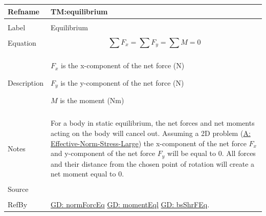 \documentclass[12pt]{article}
\begin{document}
\noindent \begin{minipage}{\textwidth}
\begin{tabular}{p{} p{}}
\toprule \textbf{Refname} & \textbf{TM:equilibrium}
\label{TM:equilibrium}
\\ \midrule \\
Label & Equilibrium
        \\ \midrule \\
        Equation & \begin{displaymath}
                   \displaystyle\sum{{F_{x}}}=\displaystyle\sum{{F_{y}}}=\displaystyle\sum{M}=0
                   \end{displaymath}
                   \\ \midrule \\
                   Description & \begin{symbDescription}
                                 \item{${F_{x}}$ is the x-component of the net force (N)}
                                 \item{${F_{y}}$ is the y-component of the net force (N)}
                                 \item{$M$ is the moment (Nm)}
                                 \end{symbDescription}
                                 \\ \midrule \\
                                 Notes & For a body in static equilibrium, the net forces and net moments acting on the body will cancel out. Assuming a 2D problem (\hyperref[A:Effective-Norm-Stress-Large]{A: Effective-Norm-Stress-Large}) the x-component of the net force ${F_{x}}$ and y-component of the net force ${F_{y}}$ will be equal to $0$. All forces and their distance from the chosen point of rotation will create a net moment equal to $0$.
                                         \\ \midrule \\
                                         Source & \cite{fredlund1977}
                                                  \\ \midrule \\
                                                  RefBy & \hyperref[GD:normForcEq]{GD: normForcEq} \hyperref[GD:momentEql]{GD: momentEql} \hyperref[GD:bsShrFEq]{GD: bsShrFEq}.
\\ \bottomrule \end{tabular}
\end{minipage}
\par~
\end{document}
